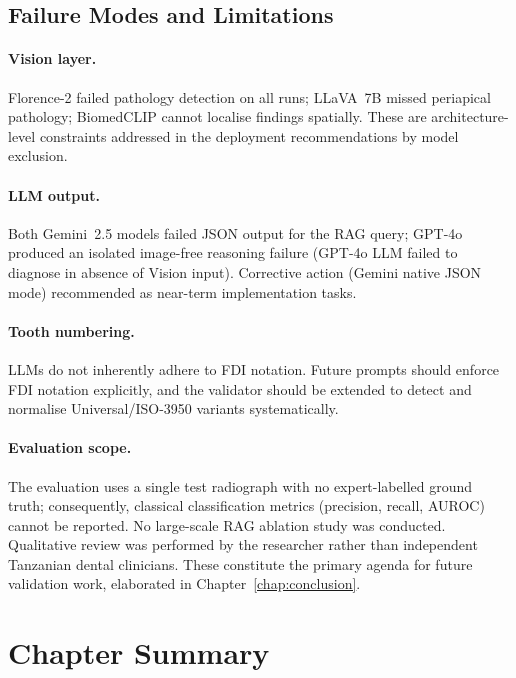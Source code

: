 \documentclass[12pt,a4paper]{report}
\begin{document}
\subsection{Failure Modes and Limitations}

\paragraph{Vision layer.}
Florence-2 failed pathology detection on all runs; LLaVA~7B missed periapical
pathology; BiomedCLIP cannot localise findings spatially. These are
architecture-level constraints addressed in the deployment recommendations
by model exclusion.

\paragraph{LLM output.}
Both Gemini~2.5 models failed JSON output for the RAG query; GPT-4o produced an isolated image-free reasoning
failure (GPT-4o LLM failed to diagnose in absence of Vision input). Corrective action (Gemini native JSON mode) recommended as near-term implementation tasks.

\paragraph{Tooth numbering.}
LLMs do not inherently adhere to FDI notation. Future prompts should enforce
FDI notation explicitly, and the validator should be extended to detect and
normalise Universal/ISO-3950 variants systematically.

\paragraph{Evaluation scope.}
The evaluation uses a single test radiograph with no expert-labelled ground
truth; consequently, classical classification metrics (precision, recall, AUROC)
cannot be reported. No large-scale RAG ablation study was conducted. Qualitative
review was performed by the researcher rather than independent Tanzanian dental
clinicians. These constitute the primary agenda for future validation work,
elaborated in Chapter~\ref{chap:conclusion}.

\section{Chapter Summary}
\label{sec:ch5_summary}
\end{document}

